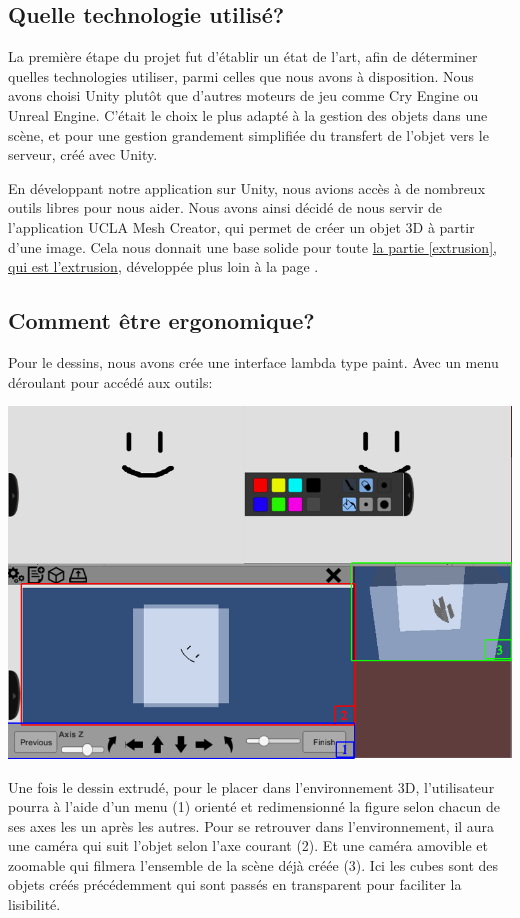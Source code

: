 \documentclass[a4paper,11pt]{article}
\begin{document}
		\subsection{Quelle technologie utilisé?}
		La première étape du projet fut d'établir un état de l'art, afin de déterminer quelles technologies utiliser, parmi celles que nous avons à disposition. Nous avons choisi Unity plutôt que d'autres moteurs de jeu comme Cry Engine ou Unreal Engine. C'était le choix le plus adapté à la gestion des objets dans une scène, et pour une gestion grandement simplifiée du transfert de l'objet vers le serveur, créé avec Unity. 
		
		En développant notre application sur Unity, nous avions accès à de nombreux outils libres pour nous aider. Nous avons ainsi décidé de nous servir de l'application UCLA Mesh Creator, qui permet de créer un objet 3D à partir d'une image. Cela nous donnait une base solide pour toute \hyperlink{ancre}{la partie \ref{extrusion}, qui est l'extrusion}, développée plus loin à la page \pageref{extrusion}. 
		
		\subsection{Comment être ergonomique?}
		Pour le dessins, nous avons crée une interface lambda type paint. Avec un menu déroulant pour accédé aux outils:
		
		\centerline{\includegraphics[scale=0.5]{images/Cmt_placer.png}}
		
		Une fois le dessin extrudé, pour le placer dans l'environnement 3D, l'utilisateur pourra à l'aide d'un menu (1) orienté et redimensionné la figure selon chacun de ses axes les un après les autres. Pour se retrouver dans l'environnement, il aura une caméra qui suit l'objet selon l'axe courant (2). Et une caméra amovible et zoomable qui filmera l'ensemble de la scène déjà créée (3). Ici les cubes sont des objets créés précédemment qui sont passés en transparent pour faciliter la lisibilité.\newline\newline
\end{document}
